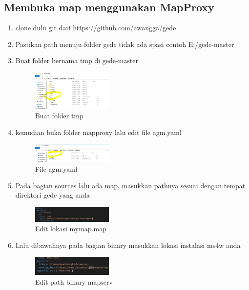 \subsection{Membuka map menggunakan MapProxy}
\begin{enumerate}
  \item clone dulu git dari https://github.com/awangga/gede
  \item Pastikan path menuju folder gede tidak ada spasi contoh E:/gede-master
  \item Buat folder bernama tmp di gede-master
  \hfill\break
  \begin{figure}[H]
  \includegraphics[width=4cm]{figures/tugas4/1174080/tmp.PNG}
  \centering
  \caption{Buat folder tmp}
  \end{figure}

  \item kemudian buka folder mapproxy lalu edit file agm.yaml
  \hfill\break
  \begin{figure}[H]
  \includegraphics[width=4cm]{figures/tugas4/1174080/agm.PNG}
  \centering
  \caption{File agm.yaml}
  \end{figure}

  \item Pada bagian sources lalu ada map, masukkan pathnya sesuai dengan tempat direktori gede yang anda 
  \hfill\break
  \begin{figure}[H]
  \includegraphics[width=4cm]{figures/tugas4/1174080/maymap.PNG}
  \centering
  \caption{Edit lokasi mymap.map}
  \end{figure}


  \item Lalu dibawahnya pada bagian binary masukkan lokasi instalasi ms4w anda
  \hfill\break
  \begin{figure}[H]
  \includegraphics[width=4cm]{figures/tugas4/1174080/mapserv.PNG}
  \centering
  \caption{Edit path binary mapserv}
  \end{figure}



\end{enumerate}
